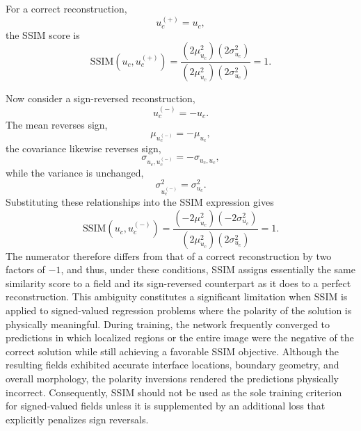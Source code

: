 \documentclass[preprint,review,12pt]{elsarticle}
\begin{document}
\begin{itemize}
For a correct reconstruction,
\begin{equation*}
    u_c^{(+)} = u_c,
\end{equation*}
the SSIM score is
\begin{equation*}
\mathrm{SSIM}(u_c,u_c^{(+)})
=
\frac{\left(2\mu_{u_c}^2\right)\left(2\sigma_{u_c}^2\right)}
{\left(2\mu_{u_c}^2\right)\left(2\sigma_{u_c}^2\right)}
=1.
\end{equation*}

Now consider a sign-reversed reconstruction,
\begin{equation*}
    u_c^{(-)}=-u_c.
\end{equation*}
The mean reverses sign,
\begin{equation*}
    \mu_{u_c^{(-)}}=-\mu_{u_c},
\end{equation*}
the covariance likewise reverses sign,
\begin{equation*}
    \sigma_{u_c,u_c^{(-)}}
    =
    -\sigma_{u_c,u_c},
\end{equation*}
while the variance is unchanged,
\begin{equation*}
    \sigma_{u_c^{(-)}}^2=\sigma_{u_c}^2.
\end{equation*}
Substituting these relationships into the SSIM expression gives
\begin{equation*}
\mathrm{SSIM}(u_c,u_c^{(-)})
=
\frac{\left(-2\mu_{u_c}^2\right)\left(-2\sigma_{u_c}^2\right)}
{\left(2\mu_{u_c}^2\right)\left(2\sigma_{u_c}^2\right)}=1.
\end{equation*}
The numerator therefore differs from that of a correct reconstruction by two factors of $-1$, and thus, under these conditions, SSIM assigns essentially the same similarity score to a field and its sign-reversed counterpart as it does to a perfect reconstruction. This ambiguity constitutes a significant limitation when SSIM is applied to signed-valued regression problems where the polarity of the solution is physically meaningful. During training, the network frequently converged to predictions in which localized regions or the entire image were the negative of the correct solution while still achieving a favorable SSIM objective. Although the resulting fields exhibited accurate interface locations, boundary geometry, and overall morphology, the polarity inversions rendered the predictions physically incorrect. Consequently, SSIM should not be used as the sole training criterion for signed-valued fields unless it is supplemented by an additional loss that explicitly penalizes sign reversals.


\end{itemize}
\end{document}

